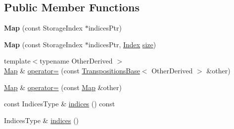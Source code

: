 \subsection*{Public Member Functions}
\begin{DoxyCompactItemize}
\item 
\mbox{\label{class_eigen_1_1_map_3_01_transpositions_3_01_size_at_compile_time_00_01_max_size_at_compile_timecc993082d7c0ba51ca94b27e97da8dd3_a3c4be558224760d052bfb9ec2d10c40f}} 
{\bfseries Map} (const Storage\+Index $\ast$indices\+Ptr)
\item 
\mbox{\label{class_eigen_1_1_map_3_01_transpositions_3_01_size_at_compile_time_00_01_max_size_at_compile_timecc993082d7c0ba51ca94b27e97da8dd3_ad37331d919ec50860540347c770106ec}} 
{\bfseries Map} (const Storage\+Index $\ast$indices\+Ptr, \hyperlink{class_eigen_1_1_transpositions_base_a3f5f06118b419e8e6ccbe49ed5b4c91f}{Index} \hyperlink{class_eigen_1_1_transpositions_base_a6888d6261a9cc24ee8607496e610a5a3}{size})
\item 
{\footnotesize template$<$typename Other\+Derived $>$ }\\\hyperlink{group___core___module_class_eigen_1_1_map}{Map} \& \hyperlink{class_eigen_1_1_map_3_01_transpositions_3_01_size_at_compile_time_00_01_max_size_at_compile_timecc993082d7c0ba51ca94b27e97da8dd3_a903d189a8b363033ec9b1cba0190b11b}{operator=} (const \hyperlink{class_eigen_1_1_transpositions_base}{Transpositions\+Base}$<$ Other\+Derived $>$ \&other)
\item 
\hyperlink{group___core___module_class_eigen_1_1_map}{Map} \& \hyperlink{class_eigen_1_1_map_3_01_transpositions_3_01_size_at_compile_time_00_01_max_size_at_compile_timecc993082d7c0ba51ca94b27e97da8dd3_aaafbdb07fbd22f5ac9171e6b03d783f4}{operator=} (const \hyperlink{group___core___module_class_eigen_1_1_map}{Map} \&other)
\item 
const Indices\+Type \& \hyperlink{class_eigen_1_1_map_3_01_transpositions_3_01_size_at_compile_time_00_01_max_size_at_compile_timecc993082d7c0ba51ca94b27e97da8dd3_a08d5e1dd2e82fc92b82873bf740e4f24}{indices} () const
\item 
Indices\+Type \& \hyperlink{class_eigen_1_1_map_3_01_transpositions_3_01_size_at_compile_time_00_01_max_size_at_compile_timecc993082d7c0ba51ca94b27e97da8dd3_a1f8c96b93122a0e3237a05c11e8812c5}{indices} ()

\end{DoxyCompactItemize}
